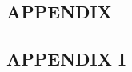 \begin{appendices}

\chapter{APPENDIX}

\section{APPENDIX I}
\label{sect::appendix_i}



\end{appendices}